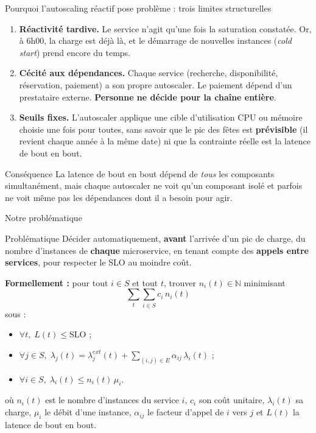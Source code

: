 \documentclass[aspectratio=169,10pt]{beamer}
\begin{document}
\begin{frame}{Pourquoi l'autoscaling réactif pose problème : trois limites structurelles}
  \begin{enumerate}
    \item \textbf{Réactivité tardive.} Le service n'agit qu'une fois la saturation constatée. Or, à 6h00, la charge est déjà là, et le démarrage de nouvelles instances (\emph{cold start}) prend encore du temps.
    \item \textbf{Cécité aux dépendances.} Chaque service (recherche, disponibilité, réservation, paiement) a son propre autoscaler. Le paiement dépend d'un prestataire externe. \textbf{Personne ne décide pour la chaîne entière}.
    \item \textbf{Seuils fixes.} L'autoscaler applique une cible d'utilisation CPU ou mémoire choisie une fois pour toutes, sans savoir que le pic des fêtes est \textbf{prévisible} (il revient chaque année à la même date) ni que la contrainte réelle est la latence de bout en bout.
  \end{enumerate}

  \vspace{0.3cm}
  \begin{alertblock}{Conséquence}
    La latence de bout en bout dépend de \emph{tous} les composants simultanément, mais chaque autoscaler ne voit qu'un composant isolé et parfois ne voit même pas les dépendances dont il a besoin pour agir.
  \end{alertblock}
\end{frame}

\begin{frame}{Notre problématique}
  \begin{alertblock}{Problématique}
    Décider automatiquement, \textbf{avant} l'arrivée d'un pic de charge, du nombre d'instances de \textbf{chaque} microservice, en tenant compte des \textbf{appels entre services}, pour respecter le SLO au moindre coût.
  \end{alertblock}

  \vspace{0.2cm}
  \textbf{Formellement :} pour tout \(i \in S\) et tout \(t\), trouver \(n_i(t) \in \mathbb{N}\) minimisant
  \[
  \sum_t \sum_{i \in S} c_i \, n_i(t)
  \]
  sous :
  \begin{itemize}
    \item \(\forall t,\; L(t) \le \text{SLO}\) ;
    \item \(\forall j \in S,\; \lambda_j(t) = \lambda_j^{ext}(t) + \sum_{(i,j) \in E} \alpha_{ij} \, \lambda_i(t)\) ;
    \item \(\forall i \in S,\; \lambda_i(t) \le n_i(t) \, \mu_i\).
  \end{itemize}
  {\scriptsize où \(n_i(t)\) est le nombre d'instances du service \(i\), \(c_i\) son coût unitaire, \(\lambda_i(t)\) sa charge, \(\mu_i\) le débit d'une instance, \(\alpha_{ij}\) le facteur d'appel de \(i\) vers \(j\) et \(L(t)\) la latence de bout en bout.\par}
\end{frame}
\end{document}
